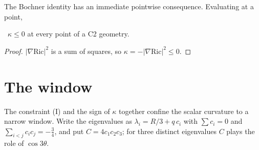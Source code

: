 The Bochner identity has an immediate pointwise consequence. Evaluating at a point,

\begin{corollary}\label{cor:kappasign}\ver\
$\kappa\le0$ at every point of a C2 geometry.
\end{corollary}
\begin{proof}
$|\nabla\mathrm{Ric}|^2$ is a sum of squares, so $\kappa=-|\nabla\mathrm{Ric}|^2\le0$.
\end{proof}


\section{The window}

The constraint (I) and the sign of $\kappa$ together confine the scalar curvature to a narrow window. Write the eigenvalues as $\lambda_i=R/3+q\,c_i$ with $\sum c_i=0$ and $\sum_{i<j}c_ic_j=-\frac34$, and put $C=4c_1c_2c_3$; for three distinct eigenvalues $C$ plays the role of $\cos3\theta$.

